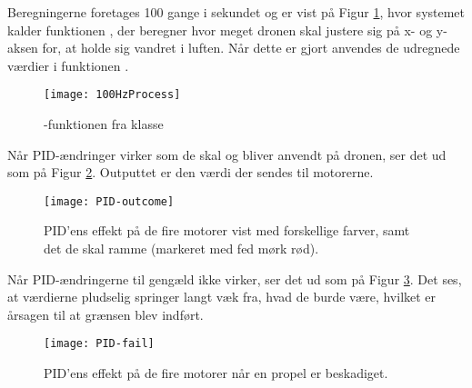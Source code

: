 \documentclass[Main]{subfiles}
\begin{document}
Beregningerne foretages 100 gange i sekundet og er vist på Figur \ref{Fig:100HzProcess}, hvor systemet kalder funktionen , der beregner hvor meget dronen skal justere sig på x- og y-aksen for, at holde sig vandret i luften.
Når dette er gjort anvendes de udregnede værdier i funktionen .

\begin{figure}[H]
\centering
\texttt{[image: 100HzProcess]}
\caption{-funktionen fra klasse }
\label{Fig:100HzProcess}
\end{figure}

Når PID-ændringer virker som de skal og bliver anvendt på dronen, ser det ud som på Figur \ref{Fig:PID-outcome}. Outputtet er den værdi der sendes til motorerne.

\begin{figure}[htbp]
\centering
\texttt{[image: PID-outcome]}
\caption{PID'ens effekt på de fire motorer vist med forskellige farver, samt det de skal ramme (markeret med fed mørk rød).}
\label{Fig:PID-outcome}
\end{figure}

Når PID-ændringerne til gengæld ikke virker, ser det ud som på Figur \ref{Fig:PID-fail}.
Det ses, at værdierne pludselig springer langt væk fra, hvad de burde være, hvilket er årsagen til at grænsen blev indført.

\begin{figure}[htbp]
\centering
\texttt{[image: PID-fail]}
\caption{PID'ens effekt på de fire motorer når en propel er beskadiget.}
\label{Fig:PID-fail}
\end{figure}
\end{document}
